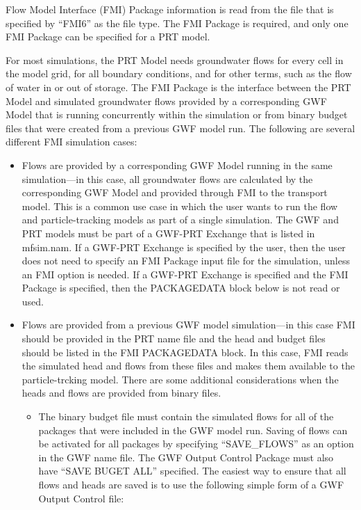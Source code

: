 Flow Model Interface (FMI) Package information is read from the file that is specified by ``FMI6'' as the file type.  The FMI Package is required, and only one FMI Package can be specified for a PRT model.

For most simulations, the PRT Model needs groundwater flows for every cell in the model grid, for all boundary conditions, and for other terms, such as the flow of water in or out of storage.  The FMI Package is the interface between the PRT Model and simulated groundwater flows provided by a corresponding GWF Model that is running concurrently within the simulation or from binary budget files that were created from a previous GWF model run.  The following are several different FMI simulation cases:

\begin{itemize}

\item Flows are provided by a corresponding GWF Model running in the same simulation---in this case, all groundwater flows are calculated by the corresponding GWF Model and provided through FMI to the transport model.  This is a common use case in which the user wants to run the flow and particle-tracking models as part of a single simulation.  The GWF and PRT models must be part of a GWF-PRT Exchange that is listed in mfsim.nam.  If a GWF-PRT Exchange is specified by the user, then the user does not need to specify an FMI Package input file for the simulation, unless an FMI option is needed.  If a GWF-PRT Exchange is specified and the FMI Package is specified, then the PACKAGEDATA block below is not read or used.

\item Flows are provided from a previous GWF model simulation---in this case FMI should be provided in the PRT name file and the head and budget files should be listed in the FMI PACKAGEDATA block.  In this case, FMI reads the simulated head and flows from these files and makes them available to the particle-trcking model.  There are some additional considerations when the heads and flows are provided from binary files.

\begin{itemize}
\item The binary budget file must contain the simulated flows for all of the packages that were included in the GWF model run.  Saving of flows can be activated for all packages by specifying ``SAVE\_FLOWS'' as an option in the GWF name file.  The GWF Output Control Package must also have ``SAVE BUGET ALL'' specified.  The easiest way to ensure that all flows and heads are saved is to use the following simple form of a GWF Output Control file:


\end{itemize}
\end{itemize}
